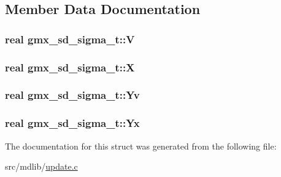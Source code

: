 \subsection{\-Member \-Data \-Documentation}
\hypertarget{structgmx__sd__sigma__t_a4862712468ca3935ed38720ba3581321}{
\subsubsection[{\-V}]{\setlength{\rightskip}{0pt plus 5cm}real {\bf gmx\-\_\-sd\-\_\-sigma\-\_\-t\-::\-V}}}\label{structgmx__sd__sigma__t_a4862712468ca3935ed38720ba3581321}
\hypertarget{structgmx__sd__sigma__t_ad7691ca7af48a24392d2985051e1e9f5}{
\subsubsection[{\-X}]{\setlength{\rightskip}{0pt plus 5cm}real {\bf gmx\-\_\-sd\-\_\-sigma\-\_\-t\-::\-X}}}\label{structgmx__sd__sigma__t_ad7691ca7af48a24392d2985051e1e9f5}
\hypertarget{structgmx__sd__sigma__t_a5be9817fe6d66dc070628378ae5a797d}{
\subsubsection[{\-Yv}]{\setlength{\rightskip}{0pt plus 5cm}real {\bf gmx\-\_\-sd\-\_\-sigma\-\_\-t\-::\-Yv}}}\label{structgmx__sd__sigma__t_a5be9817fe6d66dc070628378ae5a797d}
\hypertarget{structgmx__sd__sigma__t_af88780609e2a843b5039ac17c75bc079}{
\subsubsection[{\-Yx}]{\setlength{\rightskip}{0pt plus 5cm}real {\bf gmx\-\_\-sd\-\_\-sigma\-\_\-t\-::\-Yx}}}\label{structgmx__sd__sigma__t_af88780609e2a843b5039ac17c75bc079}


\-The documentation for this struct was generated from the following file\-:\begin{DoxyCompactItemize}
\item 
src/mdlib/\hyperlink{update_8c}{update.\-c}\end{DoxyCompactItemize}
